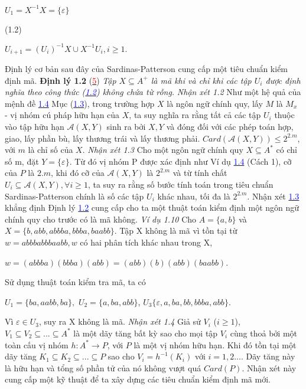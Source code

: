 $
    U_1 = X^{-1}X = \{ \varepsilon \}
$ \\
\begin{flushright}
    (1.2)
\end{flushright}
$
    U_{i+1} = (U_i)^{-1}X \cup X^{-1}U_i, i \ge 1. 
$
\begin{flushleft}
\hspace{10mm}Định lý cơ bản sau đây của Sardinas-Patterson cung cấp một tiêu chuẩn kiểm định mã.
\textbf{Định lý 1.2} (\hyperlink{page.81}{\textcolor{red}{5}}) \textit{Tập $X \subseteq A^+$ là mã khi và chỉ khi các tập $U_i$ được định nghĩa theo công thức (\hyperlink{page.21}{\textcolor{blue}{1.2}}) không chứa từ rỗng.}
\textit{Nhận xét 1.2}   Như một hệ quả của mệnh đề \hyperlink{page.18}{\textcolor{blue}{1.4}} Mục (\hyperlink{page.13}{\textcolor{blue}{1.3}}), trong trường hợp $X$ là ngôn ngữ chính quy, lấy $M$ là $M_x$ - vị nhóm cú pháp hữu hạn của $X$, ta suy nghĩa ra rằng tất cả các tập $U_i$ thuộc vào tập hữu hạn $\mathcal{A}(X,Y)$ sinh ra bởi $X,Y$ và đóng đối với các phép toán hợp, giao, lấy phần bù, lấy thương trái và lấy thương phải. $Card(\mathcal{A}(X,Y)) \le 2^{2.m}$, với $m$ là chỉ số của $X$.
\textit{Nhận xét 1.3}   Cho một ngôn ngữ chính quy $X \subseteq A^*$ có chỉ số m, đặt $Y = \{ \varepsilon \}$. Từ đó vị nhóm P được xác định như Ví dụ \hyperlink{page.18}{\textcolor{blue}{1.4}} (Cách 1), cỡ của $P$ là $2.m$, khi đó cỡ của $\mathcal{A}(X,Y)$ là $2^{2.m}$ và từ tính chất $U_i \subseteq \mathcal{A}(X,Y), \forall i \ge 1$, ta suy ra rằng số bước tính toán trong tiêu chuẩn Sardinas-Patterson chính là số các tập $U_i$ khác nhau, tối đa là $2^{2.m}$.
\hspace{10mm}Nhận xét \hyperlink{page.13}{\textcolor{blue}{1.3}} khẳng định Định lý \hyperlink{page.21}{\textcolor{blue}{1.2}} cung cấp cho ta một thuật toán kiểm định một ngôn ngữ chính quy cho trước có là mã không.
\textit{Ví dụ 1.10}     Cho $A = \{ a,b \}$ và $X = \{ b, abb, abbba, bbba, baabb \}$. Tập X không là mã vì tồn tại từ $w = abbbabbbaabb, w$ có hai phân tích khác nhau trong X,    
\end{flushleft}
$w = (abbba)(bbba)(abb) = (abb)(b)(abb)(baabb)$.
\begin{flushleft}
\hspace{10mm}Sử dụng thuật toán kiểm tra mã, ta có 
\end{flushleft}
\hspace{10mm}$U_1 = \{ ba, aabb, ba \},$     $U_2 = \{ a, ba, abb \}$,   $U_3 \{ \varepsilon, a, ba, bb, bbba, abb \}$.
\begin{flushleft}
\hspace{10mm}Vì $\varepsilon \in U_3$, suy ra X không là mã.
\textit{Nhận xét 1.4}   Giả sử $V_i$ ($i \ge 1$), $V_1 \subseteq V_2 \subseteq ... \subseteq A^*$ là một dãy tăng bất kỳ sao cho mọi tập $V_i$ cùng thoả bởi một toàn cấu vị nhóm $h : A^* \to P$, với $P$ là một vị nhóm hữu hạn. Khi đó tồn tại một dãy tăng $K_1 \subseteq K_2 \subseteq ... \subseteq P$ sao cho $V_i = h^{-1}(K_i)$ với $i = 1,2....$ Dãy tăng này là hữu hạn và tổng số phần tử của nó không vượt quá $Card(P)$. Nhận xét này cung cấp một kỹ thuật để ta xây dựng các tiêu chuẩn kiểm định mã mới.
\end{flushleft}
